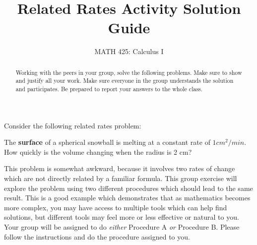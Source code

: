 \documentclass{ximera}
\title{Related Rates Activity Solution Guide}
\author{MATH 425: Calculus I}
\begin{document}
\begin{abstract}
   Working with the peers in your group, solve the following problems. Make sure to show and justify all your work. Make sure everyone in the group understands the solution and participates. Be prepared to report your answers to the whole class. 
\end{abstract}
\maketitle


Consider the following related rates problem:\\
\begin{example}
    The \textbf{surface} of a spherical snowball is melting at a constant rate of $1cm^2/min$.  How quickly is the volume changing when the radius is 2 cm?\\
\end{example}

This problem is somewhat awkward, because it involves two rates of change which are not directly related by a familiar formula.  This group exercise will explore the problem using two different procedures which should lead to the same result.  This is a good example which demonstrates that as mathematics becomes more complex, you may have access to multiple tools which can help find solutions, but different tools may feel more or less effective or natural to you.\\
Your group will be assigned to do \textit{either} Procedure A \textit{or} Procedure B.  Please follow the instructions and do the procedure assigned to you.
\end{document}
